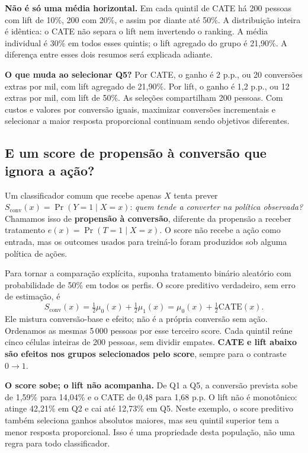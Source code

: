 \textbf{Não é só uma média horizontal.} Em cada quintil de CATE há 200 pessoas com lift de 10\%, 200 com 20\%, e assim por diante até 50\%. A distribuição inteira é idêntica: o CATE não separa o lift nem invertendo o ranking. A média individual é 30\% em todos esses quintis; o lift agregado do grupo é 21,90\%. A diferença entre esses dois resumos será explicada adiante.

\textbf{O que muda ao selecionar Q5?} Por CATE, o ganho é 2 p.p., ou 20 conversões extras por mil, com lift agregado de 21,90\%. Por lift, o ganho é 1,2 p.p., ou 12 extras por mil, com lift de 50\%. As seleções compartilham 200 pessoas. Com custos e valores por conversão iguais, maximizar conversões incrementais e selecionar a maior resposta proporcional continuam sendo objetivos diferentes.

\clearpage
\subsection{E um score de propensão à conversão que ignora a ação?}
\label{app:conversion_score}
Um classificador comum que recebe apenas $X$ tenta prever $S_{\mathrm{conv}}(x)=\Pr(Y=1\mid X=x)$: \emph{quem tende a converter na política observada?} Chamamos isso de \textbf{propensão à conversão}, diferente da propensão a receber tratamento $e(x)=\Pr(T=1\mid X=x)$. O score não recebe a ação como entrada, mas os outcomes usados para treiná-lo foram produzidos sob alguma política de ações.

Para tornar a comparação explícita, suponha tratamento binário aleatório com probabilidade de 50\% em todos os perfis. O score preditivo verdadeiro, sem erro de estimação, é
\[
S_{\mathrm{conv}}(x)=\tfrac12\mu_0(x)+\tfrac12\mu_1(x)
=\mu_0(x)+\tfrac12\mathrm{CATE}(x).
\]
Ele mistura conversão-base e efeito; não é a própria conversão sem ação. Ordenamos as mesmas 5\,000 pessoas por esse terceiro score. Cada quintil reúne cinco células inteiras de 200 pessoas, sem dividir empates. \textbf{CATE e lift abaixo são efeitos nos grupos selecionados pelo score}, sempre para o contraste $0\to1$.

\begin{table}[H]
\centering\small
\caption{Quintis pela propensão à conversão. O score médio é a conversão esperada na mistura 50/50; base e com ação são as duas médias contrafactuais.}
\label{tab:quantile_conversion}

\end{table}

\textbf{O score sobe; o lift não acompanha.} De Q1 a Q5, a conversão prevista sobe de 1,59\% para 14,04\% e o CATE de 0,48 para 1,68 p.p. O lift não é monotônico: atinge 42,21\% em Q2 e cai até 12,73\% em Q5. Neste exemplo, o score preditivo também seleciona ganhos absolutos maiores, mas seu quintil superior tem a menor resposta proporcional. Isso é uma propriedade desta população, não uma regra para todo classificador.

